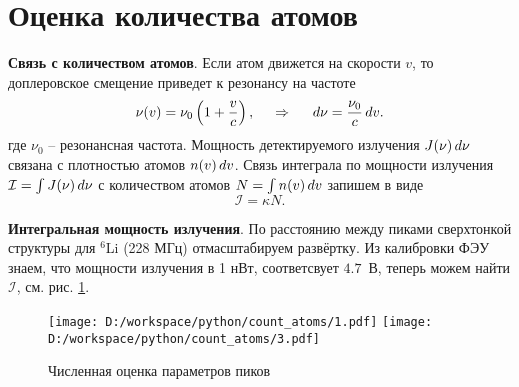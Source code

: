 \section*{Оценка количества атомов}


\textbf{Связь с количеством атомов}. 
Если атом движется на скорости $v$, то доплеровское смещение приведет к резонансу на частоте
\begin{equation*}
	\nu(v) = \nu_0 \left(1 + \frac{v}{c}\right),
	\hspace{0.5cm} \Rightarrow \hspace{0.5cm}
	d \nu = \frac{\nu_0}{c} \, d v.
\end{equation*}
где $\nu_0$ -- резонансная частота.
Мощность детектируемого излучения $J(\nu) \, d \nu$ связана с плотностью атомов $n(v) \, d v$. 
Связь интеграла по мощности излучения $\mathcal I = \int J(\nu) \, d \nu$ с количеством атомов $N = \int n(v) \, d v$ запишем в виде
\begin{equation*}
	\mathcal I = \kappa N.
\end{equation*}

\textbf{Интегральная мощность излучения}. По расстоянию между пиками сверхтонкой структуры для ${}^6$Li (228 МГц) отмасштабируем развёртку. Из калибровки ФЭУ знаем, что мощности излучения в 1 нВт, соответсвует $4.7$~В, теперь можем найти $\mathcal I$, см. рис. \ref{fig:1}.

\begin{figure}[h]
    \centering
    \vspace{-4mm}
    \texttt{[image: D:/workspace/python/count\_atoms/1.pdf]}
    \hspace{5 mm} 
    \texttt{[image: D:/workspace/python/count\_atoms/3.pdf]}
    \vspace{-4mm}
    \caption{Численная оценка параметров пиков}
    \label{fig:1}
\end{figure}
\vspace{-4mm}


